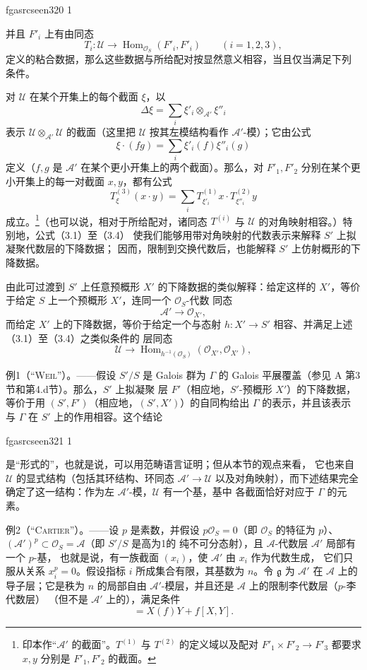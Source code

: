 \documentclass[12pt,twoside,openany]{book}
\numberwithin{equation}{section}
\newcommand{\fgaunitid}{unbound}
\newcommand{\src}[1]{%
  \phantomsection
  \hypertarget{src:\fgaunitid:#1}{}%
  \hypertarget{fga.\fgaunitid.p#1}{}%
  \ifcsname fgasrcseen#1\endcsname\else
    \expandafter\gdef\csname fgasrcseen#1\endcsname{1}%
    \hypertarget{src:#1}{}%
  \fi
  \marginpar{\raggedleft\footnotesize\sffamily #1}%
}
\newcommand{\fquote}[1]{“#1”}
\theoremstyle{plain}
\theoremstyle{definition}
\theoremstyle{remark}
\begin{document}
\src{320}
并且 $F'_i$ 上有由同态
\[
  T_i:\mathcal U\longrightarrow
  \operatorname{Hom}_{\mathcal O_S}(F'_i,F'_i)
  \qquad (i=1,2,3),
\]
定义的粘合数据，那么这些数据与所给配对按显然意义相容，当且仅当满足下列
条件。

对 $\mathcal U$ 在某个开集上的每个截面 $\xi$，以
\[
  \Delta\xi=\sum_i\xi'_i\otimes_{\mathcal A'}\xi''_i
\]
表示 $\mathcal U\otimes_{\mathcal A'}\mathcal U$ 的截面（这里把
$\mathcal U$ 按其左模结构看作 $\mathcal A'$-模）；它由公式
\[
  \xi\mathbin{\cdot}(fg)=\sum_i\xi'_i(f)\xi''_i(g)
\]
定义（$f,g$ 是 $\mathcal A'$ 在某个更小开集上的两个截面）。那么，对
$F'_1,F'_2$ 分别在某个更小开集上的每一对截面 $x,y$，都有公式
\begin{equation}
  T^{(3)}_\xi(x\mathbin{\cdot}y)
  =\sum_iT^{(1)}_{\xi'_i}x\mathbin{\cdot}T^{(2)}_{\xi''_i}y
  \tag{3.4}
\end{equation}
成立。\footnote{印本作\fquote{$\mathcal A'$ 的截面}。$T^{(1)}$ 与
$T^{(2)}$ 的定义域以及配对 $F'_1\times F'_2\longrightarrow F'_3$ 都要求
$x,y$ 分别是 $F'_1,F'_2$ 的截面。}（也可以说，相对于所给配对，诸同态
$T^{(i)}$ 与 $\mathcal U$ 的对角映射相容。）特别地，公式（3.1）至（3.4）
使我们能够用带对角映射的代数表示来解释 $S'$ 上拟凝聚代数层的下降数据；
因而，限制到交换代数后，也能解释 $S'$ 上仿射概形的下降数据。

由此可过渡到 $S'$ 上任意预概形 $X'$ 的下降数据的类似解释：给定这样的
$X'$，等价于给定 $S$ 上一个预概形 $X'$，连同一个 $\mathcal O_S$-代数
同态
\[
  \mathcal A'\longrightarrow\mathcal O_{X'},
\]
而给定 $X'$ 上的下降数据，等价于给定一个与态射
$h:X'\longrightarrow S'$ 相容、并满足上述（3.1）至（3.4）之类似条件的
层同态
\[
  \mathcal U\longrightarrow
  \operatorname{Hom}_{h^{-1}(\mathcal O_S)}
  (\mathcal O_{X'},\mathcal O_{X'}),
\]

\textsc{例1（\fquote{Weil}）。}——假设 $S'/S$ 是 Galois 群为
$\Gamma$ 的 Galois 平展覆盖（参见 A 第3节和第4.d节）。那么，$S'$ 上拟凝聚
层 $F'$（相应地，$S'$-预概形 $X'$）的下降数据，等价于用
$(S',F')$（相应地，$(S',X')$）的自同构给出 $\Gamma$ 的表示，并且该表示
与 $\Gamma$ 在 $S'$ 上的作用相容。这个结论

\src{321}
是\fquote{形式的}，也就是说，可以用范畴语言证明；但从本节的观点来看，
它也来自 $\mathcal U$ 的显式结构（包括其环结构、环同态
$\mathcal A'\longrightarrow\mathcal U$ 以及对角映射），而下述结果完全
确定了这一结构：作为左 $\mathcal A'$-模，$\mathcal U$ 有一个基，基中
各截面恰好对应于 $\Gamma$ 的元素。

\textsc{例2（\fquote{Cartier}）。}——设 $p$ 是素数，并假设
$p\mathcal O_S=0$（即 $\mathcal O_S$ 的特征为 $p$）、
$(\mathcal A')^p\subset\mathcal O_S=\mathcal A$（即 $S'/S$ 是高为1的
纯不可分态射），且 $\mathcal A$-代数层 $\mathcal A'$ 局部有一个 $p$-基，
也就是说，有一族截面 $(x_i)$，使 $\mathcal A'$ 由 $x_i$ 作为代数生成，
它们只服从关系 $x_i^p=0$。假设指标 $i$ 所成集合有限，其基数为 $n$。令
$\mathfrak g$ 为 $\mathcal A'$ 在 $\mathcal A$ 上的导子层；它是秩为 $n$
的局部自由 $\mathcal A'$-模层，并且还是 $\mathcal A$ 上的限制李代数层（$p$-李代数层）
（但不是 $\mathcal A'$ 上的），满足条件
\begin{equation}
  [X,fY]=X(f)Y+f[X,Y].
  \tag{3.5}
\end{equation}
\end{document}

